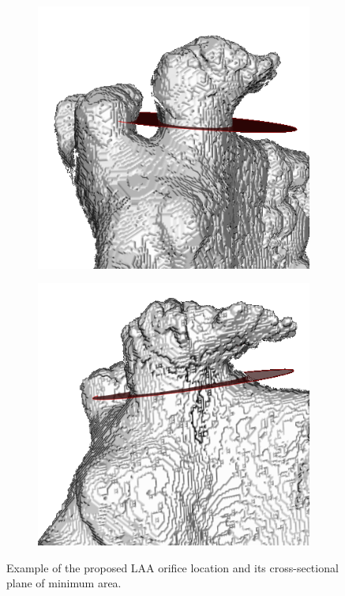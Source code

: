 \documentclass[review]{elsarticle}
\begin{document}
\begin{figure}[t]
  \centering
  \begin{subfigure}[b]{.33\linewidth}
    \centering
    \includegraphics[width=\textwidth]{fig8a.png}
    \label{fig:plane_dataset2_view1} 
  \end{subfigure}%
  \hspace{1em}
  \begin{subfigure}[b]{.33\linewidth}
    \centering
    \includegraphics[width=\textwidth]{fig8b.png}
    \label{fig:plane_dataset2_view2} 
  \end{subfigure}
  \caption{Example of the proposed LAA orifice location and its cross-sectional plane of minimum area.  }
  \label{fig:plane_dataset2}
\end{figure}
\end{document}
